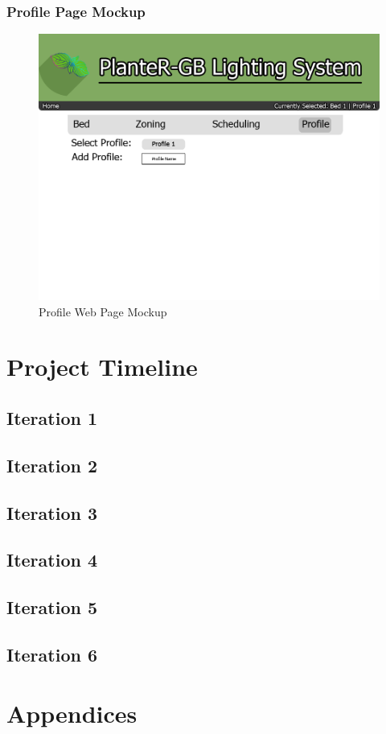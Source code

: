 \documentclass[onecolumn, draftclsnofoot,10pt, compsoc]{IEEEtran}
\begin{document}
			            \subsubsection{Profile Page Mockup}
			            \begin{center}
			                \begin{figure}[H]
			                    \includegraphics[width=\linewidth]{web_design/ProfilePage.png}
			                    \caption{Profile Web Page Mockup}
			                    \label{fig:Profile Page}
			                \end{figure}
			            \end{center}


	\section{Project Timeline}
		\subsection{Iteration 1}
		\subsection{Iteration 2}
		\subsection{Iteration 3}
		\subsection{Iteration 4}
		\subsection{Iteration 5}
		\subsection{Iteration 6}


	\section{Appendices} %
\end{document}
